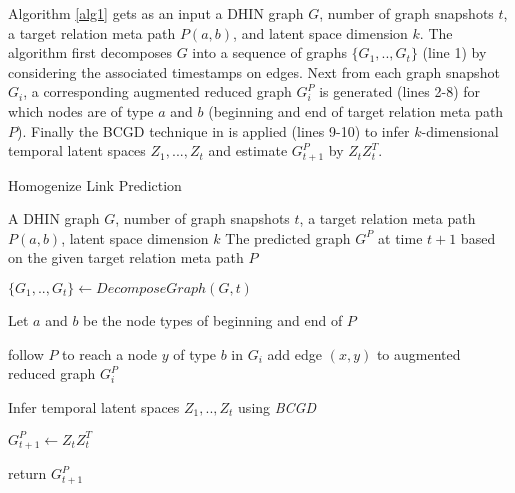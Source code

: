 


Algorithm \ref{alg1} gets as an input a DHIN graph $G$, number of graph snapshots $t$, a target relation meta path $P(a,b)$, and latent space dimension $k$. The algorithm first decomposes $G$ into a sequence of graphs $\{G_1, .., G_t\}$ (line 1) by considering the associated timestamps on edges. Next from each graph snapshot $G_i$, a corresponding augmented reduced graph $G^P_i$ is generated (lines 2-8) for which nodes are of type $a$ and $b$ (beginning and end of target relation meta path $P$). Finally the BCGD technique in \cite{Zhu2016} is applied (lines 9-10) to infer $k$-dimensional temporal latent spaces $Z_1, ...,Z_t$ and estimate $G^P_{t+1}$ by $Z_tZ_t^T$.


\begin{algorithm}[t]
\caption{Homogenize Link Prediction}\label{alg1}
\begin{algorithmic}[1]\scriptsize
\REQUIRE A DHIN graph $G$, number of graph snapshots $t$, a target relation meta path $P(a,b)$, latent space dimension $k$
\ENSURE The predicted graph $G^P$ at time $t+1$ based on the given target relation meta path $P$

\STATE $\{G_1, .., G_t\} \leftarrow DecomposeGraph(G, t)$

    \STATE Let $a$ and $b$ be the node types of beginning and end of $P$
    
        \STATE follow $P$ to reach a node $y$ of type $b$ in $G_i$ 
        \STATE add edge $(x,y)$ to augmented reduced graph $G_i^P$ 
\ENDFOR

\ENDFOR
\STATE Infer temporal latent spaces $Z_1, .., Z_t$ using \textit{BCGD}%

\STATE $G^P_{t+1} \leftarrow Z_tZ^T_t$ 

\STATE return $G^P_{t+1}$
\end{algorithmic}
\end{algorithm}




